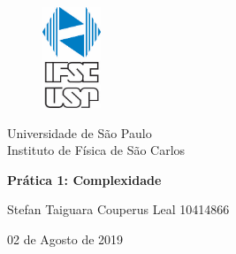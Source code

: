 \documentclass[a4paper, 12pt]{article}
\begin{document}

\begin{titlepage} 

\begin{figure}[H]
\centering
\includegraphics[width=1.75cm]{IFSC_USP.png} %

\end{figure}
    \begin{center}
        Universidade de São Paulo \\
        
        Instituto de Física de São Carlos \\


\vspace{10pt}

        
        \vspace{85pt}
        
        
         \large\textbf{{Prática 1: Complexidade}} %
        \vspace{160pt}
        
    \end{center}
    
    \begin{flushright}
        
        Stefan Taiguara Couperus Leal 10414866
    \end{flushright}
    
    \begin{center}
        \vspace{\fill}
        02 de Agosto de 2019 %
    \end{center}
\end{titlepage}

\newpage

\tableofcontents    %



\thispagestyle{empty}

\newpage
{}

\end{document}
